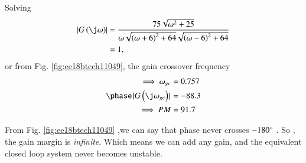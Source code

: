 Solving 
\begin{align}
\label{eq:ee18btech11049_gain}
\begin{split}
\abs{G\brak{\j\omega}} &=   \frac{75\sqrt{\omega^2 + 25}}{\omega\sqrt{\brak{\omega+6}^2+64}\sqrt{\brak{\omega-6}^2+64}} 
\\
&= 1,
\end{split}
\end{align}
or from Fig. \ref{fig:ee18btech11049}, the gain crossover frequency 
%
\begin{align}
\implies
\omega_{gc} &=  0.757  \\
\phase{G\brak{\j\omega_{gc}}} &= -88.3 \\
\implies
PM &= 91.7  
\end{align}

\solution From Fig. \ref{fig:ee18btech11049} ,we can say that phase  never crosses $-180\degree$ .
So , the gain margin is {\em infinite}.
Which means we can add any gain, and the equivalent closed loop system never becomes unstable.

